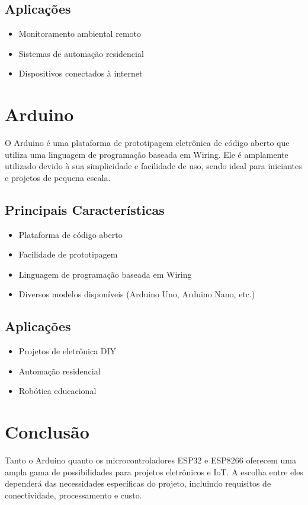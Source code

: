 \documentclass{ufersa}
\begin{document}
\subsection{Aplicações}
\begin{itemize}
    \item Monitoramento ambiental remoto
    \item Sistemas de automação residencial
    \item Dispositivos conectados à internet
\end{itemize}

\section{Arduino}
O Arduino é uma plataforma de prototipagem eletrônica de código aberto que utiliza uma linguagem de programação baseada em Wiring. Ele é amplamente utilizado devido à sua simplicidade e facilidade de uso, sendo ideal para iniciantes e projetos de pequena escala.

\subsection{Principais Características}
\begin{itemize}
    \item Plataforma de código aberto
    \item Facilidade de prototipagem
    \item Linguagem de programação baseada em Wiring
    \item Diversos modelos disponíveis (Arduino Uno, Arduino Nano, etc.)
\end{itemize}

\subsection{Aplicações}
\begin{itemize}
    \item Projetos de eletrônica DIY
    \item Automação residencial
    \item Robótica educacional
\end{itemize}

\section{Conclusão}
Tanto o Arduino quanto os microcontroladores ESP32 e ESP8266 oferecem uma ampla gama de possibilidades para projetos eletrônicos e IoT. A escolha entre eles dependerá das necessidades específicas do projeto, incluindo requisitos de conectividade, processamento e custo.
\end{document}

